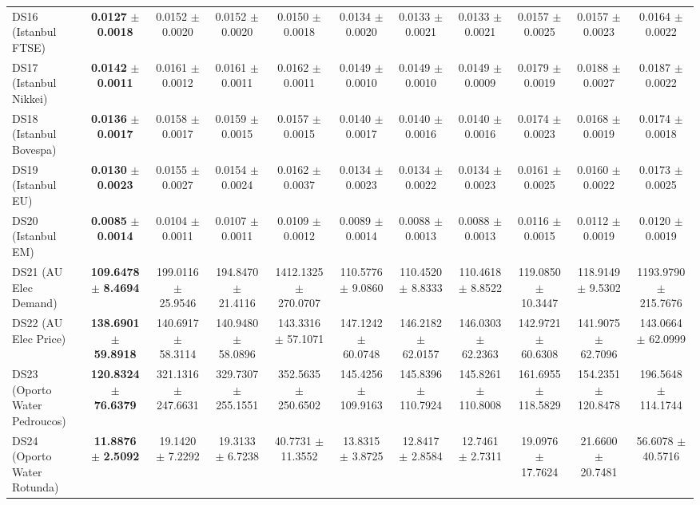 \begin{table}[t]
{{\begin{tabular}{lcccccccccc}
DS16 (Istanbul FTSE) & \textbf{0.0127} $\pm$ \textbf{0.0018} & 0.0152 $\pm$ 0.0020 & 0.0152 $\pm$ 0.0020 & 0.0150 $\pm$ 0.0018 & 0.0134 $\pm$ 0.0020 & 0.0133 $\pm$ 0.0021 & 0.0133 $\pm$ 0.0021 & 0.0157 $\pm$ 0.0025 & 0.0157 $\pm$ 0.0023 & 0.0164 $\pm$ 0.0022 \\
DS17 (Istanbul Nikkei) & \textbf{0.0142} $\pm$ \textbf{0.0011} & 0.0161 $\pm$ 0.0012 & 0.0161 $\pm$ 0.0011 & 0.0162 $\pm$ 0.0011 & 0.0149 $\pm$ 0.0010 & 0.0149 $\pm$ 0.0010 & 0.0149 $\pm$ 0.0009 & 0.0179 $\pm$ 0.0019 & 0.0188 $\pm$ 0.0027 & 0.0187 $\pm$ 0.0022 \\
DS18 (Istanbul Bovespa) & \textbf{0.0136} $\pm$ \textbf{0.0017} & 0.0158 $\pm$ 0.0017 & 0.0159 $\pm$ 0.0015 & 0.0157 $\pm$ 0.0015 & 0.0140 $\pm$ 0.0017 & 0.0140 $\pm$ 0.0016 & 0.0140 $\pm$ 0.0016 & 0.0174 $\pm$ 0.0023 & 0.0168 $\pm$ 0.0019 & 0.0174 $\pm$ 0.0018 \\
DS19 (Istanbul EU) & \textbf{0.0130} $\pm$ \textbf{0.0023} & 0.0155 $\pm$ 0.0027 & 0.0154 $\pm$ 0.0024 & 0.0162 $\pm$ 0.0037 & 0.0134 $\pm$ 0.0023 & 0.0134 $\pm$ 0.0022 & 0.0134 $\pm$ 0.0023 & 0.0161 $\pm$ 0.0025 & 0.0160 $\pm$ 0.0022 & 0.0173 $\pm$ 0.0025 \\
DS20 (Istanbul EM) & \textbf{0.0085} $\pm$ \textbf{0.0014} & 0.0104 $\pm$ 0.0011 & 0.0107 $\pm$ 0.0011 & 0.0109 $\pm$ 0.0012 & 0.0089 $\pm$ 0.0014 & 0.0088 $\pm$ 0.0013 & 0.0088 $\pm$ 0.0013 & 0.0116 $\pm$ 0.0015 & 0.0112 $\pm$ 0.0019 & 0.0120 $\pm$ 0.0019 \\
DS21 (AU Elec Demand) & \textbf{109.6478} $\pm$ \textbf{8.4694} & 199.0116 $\pm$ 25.9546 & 194.8470 $\pm$ 21.4116 & 1412.1325 $\pm$ 270.0707 & 110.5776 $\pm$ 9.0860 & 110.4520 $\pm$ 8.8333 & 110.4618 $\pm$ 8.8522 & 119.0850 $\pm$ 10.3447 & 118.9149 $\pm$ 9.5302 & 1193.9790 $\pm$ 215.7676 \\
DS22 (AU Elec Price) & \textbf{138.6901} $\pm$ \textbf{59.8918} & 140.6917 $\pm$ 58.3114 & 140.9480 $\pm$ 58.0896 & 143.3316 $\pm$ 57.1071 & 147.1242 $\pm$ 60.0748 & 146.2182 $\pm$ 62.0157 & 146.0303 $\pm$ 62.2363 & 142.9721 $\pm$ 60.6308 & 141.9075 $\pm$ 62.7096 & 143.0664 $\pm$ 62.0999 \\
DS23 (Oporto Water Pedroucos) & \textbf{120.8324} $\pm$ \textbf{76.6379} & 321.1316 $\pm$ 247.6631 & 329.7307 $\pm$ 255.1551 & 352.5635 $\pm$ 250.6502 & 145.4256 $\pm$ 109.9163 & 145.8396 $\pm$ 110.7924 & 145.8261 $\pm$ 110.8008 & 161.6955 $\pm$ 118.5829 & 154.2351 $\pm$ 120.8478 & 196.5648 $\pm$ 114.1744 \\
DS24 (Oporto Water Rotunda) & \textbf{11.8876} $\pm$ \textbf{2.5092} & 19.1420 $\pm$ 7.2292 & 19.3133 $\pm$ 6.7238 & 40.7731 $\pm$ 11.3552 & 13.8315 $\pm$ 3.8725 & 12.8417 $\pm$ 2.8584 & 12.7461 $\pm$ 2.7311 & 19.0976 $\pm$ 17.7624 & 21.6600 $\pm$ 20.7481 & 56.6078 $\pm$ 40.5716 \\
\bottomrule
\end{tabular}%
}%
}
\end{table}
